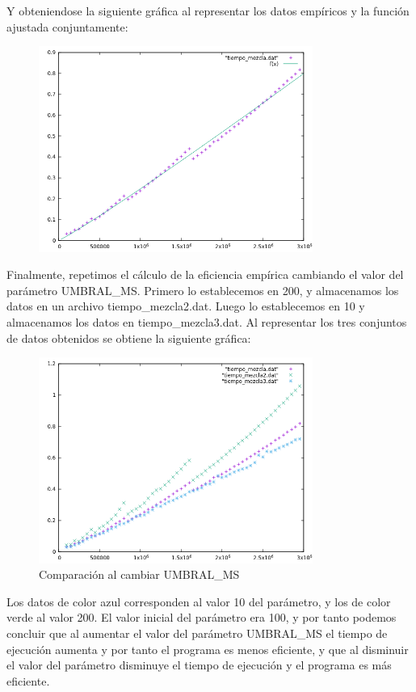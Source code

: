 \documentclass{article}
\begin{document}
\clearpage
Y obteniendose la siguiente gráfica al representar los datos empíricos y la función ajustada conjuntamente:
\begin{figure}[H]
  \caption{}
  \centering
  \includegraphics[width=0.8\textwidth]{mergegrafica.png}
\end{figure}
Finalmente, repetimos el cálculo de la eficiencia empírica cambiando el valor del parámetro UMBRAL\_MS. Primero lo establecemos en 200, y almacenamos los datos en un archivo tiempo\_mezcla2.dat. Luego lo establecemos en 10 y almacenamos los datos en tiempo\_mezcla3.dat. Al representar los tres conjuntos de datos obtenidos se obtiene la siguiente gráfica:
\begin{figure}[H]
  \caption{Comparación al cambiar UMBRAL\_MS}
  \centering
  \includegraphics[width=0.8\textwidth]{mergecomp.png}
\end{figure}
Los datos de color azul corresponden al valor 10 del parámetro, y los de color verde al valor 200. El valor inicial del parámetro era 100, y por tanto podemos concluir que al aumentar el valor del parámetro UMBRAL\_MS el tiempo de ejecución aumenta y por tanto el programa es menos eficiente, y que al disminuir el valor del parámetro disminuye el tiempo de ejecución y el programa es más eficiente.
\end{document}
